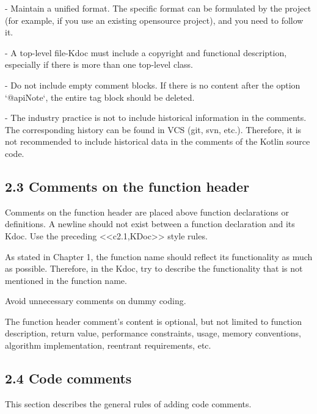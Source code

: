 - Maintain a unified format. The specific format can be formulated by the project (for example, if you use an existing opensource project), and you need to follow it.

- A top-level file-Kdoc must include a copyright and functional description, especially if there is more than one top-level class.

- Do not include empty comment blocks. If there is no content after the option `@apiNote`, the entire tag block should be deleted.

- The industry practice is not to include historical information in the comments. The corresponding history can be found in VCS (git, svn, etc.). Therefore, it is not recommended to include historical data in the comments of the Kotlin source code.



\subsection*{\textbf{2.3 Comments on the function header}}

\label{sec:2.3}



Comments on the function header are placed above function declarations or definitions. A newline should not exist between a function declaration and its Kdoc. Use the preceding <<c2.1,KDoc>> style rules.



As stated in Chapter 1, the function name should reflect its functionality as much as possible. Therefore, in the Kdoc, try to describe the functionality that is not mentioned in the function name.

Avoid unnecessary comments on dummy coding.



The function header comment's content is optional, but not limited to function description, return value, performance constraints, usage, memory conventions, algorithm implementation, reentrant requirements, etc.



\subsection*{\textbf{2.4 Code comments}}

\label{sec:2.4}



This section describes the general rules of adding code comments.



